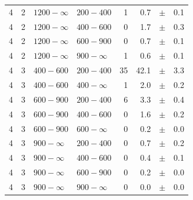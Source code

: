 \begin{table}[!h]
\begin{tabular}{rrllrrcl}
4\T & 2 & $1200- \infty$ & $200-400$ &      1 &      0.7 &$\pm$&    0.1 \\
4 & 2 & $1200- \infty$ & $400-600$ &      0 &      1.7 &$\pm$&    0.3 \\
4 & 2 & $1200- \infty$ & $600-900$ &      0 &      0.7 &$\pm$&    0.1 \\
4 & 2 & $1200- \infty$ & $900-\infty$ &      1 &      0.6 &$\pm$&    0.1 \\
4\T & 3 & $ 400- 600$ & $200-400$ &     35 &     42.1 &$\pm$&    3.3 \\
4 & 3 & $ 400- 600$ & $400-\infty$ &      1 &      2.0 &$\pm$&    0.2 \\
4\T & 3 & $ 600- 900$ & $200-400$ &      6 &      3.3 &$\pm$&    0.4 \\
4 & 3 & $ 600- 900$ & $400-600$ &      0 &      1.6 &$\pm$&    0.2 \\
4 & 3 & $ 600- 900$ & $600-\infty$ &      0 &      0.2 &$\pm$&    0.0 \\
4\T & 3 & $ 900- \infty$ & $200-400$ &      0 &      0.7 &$\pm$&    0.2 \\
4 & 3 & $ 900- \infty$ & $400-600$ &      0 &      0.4 &$\pm$&    0.1 \\
4 & 3 & $ 900- \infty$ & $600-900$ &      0 &      0.2 &$\pm$&    0.0 \\
4 & 3 & $ 900- \infty$ & $900-\infty$ &      0 &      0.0 &$\pm$&    0.0 \\
    \hline
  \end{tabular}
\end{table}

